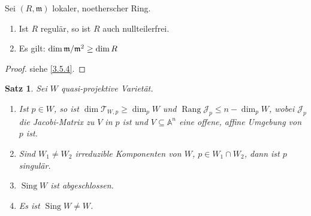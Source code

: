 \documentclass[a4paper,12pt]{scrbook}
\theoremstyle{keinenummern} %
\theoremstyle{mitnummern}
\newtheorem{satz}{Satz}
\theoremstyle{unserbeweis}
\newtheorem{proof}{Beweis}
\def\A{\mathbb{A}}
\newcommand{\J}{\mathcal{J}}
\def\T{\mathcal{T}}
\def\m{\mathfrak{m}}
\newcommand{\Rang}{\operatorname{Rang}}
\newcommand{\Sing}{\operatorname{Sing}}
\newcommand{\Quotient}[2]{
  \mathchoice
  { %
    \raisebox{0.7ex}{\ensuremath{#1}}
    \ensuremath{\mkern-3mu}\big/\ensuremath{\mkern-3mu}
    \raisebox{-0.6ex}{\ensuremath{#2}}
  }
  { %
    #1/#2
  }
  { %
    #1/#2
  }
  { %
    #1/#2
  }
}
\begin{document}
\begin{lem}\label{3.4.3} Sei $(R,\m)$ lokaler, noetherscher Ring.
  \begin{enumerate}
  \item{} Ist $R$ regulär, so ist $R$ auch nullteilerfrei.
  \item{} Es gilt: $\dim \Quotient{\m}{\m^2} \ge \dim R$
  \end{enumerate}
\end{lem}
\begin{proof}siehe \cref{3.5.4}.
\end{proof}

\begin{satz}\label{satz6} Sei $W$ quasi-projektive Varietät.
  \begin{enumerate}
   \item\label{satz6a} Ist $p\in W$, so ist $\dim \T_{W,p} \ge \dim_p W$ und $\Rang \J_p \le n-\dim_p W$, wobei $\J_p$ die Jacobi-Matrix zu $V$ in $p$ ist und $V\subseteq \A^n$ eine offene, affine Umgebung von $p$ ist.
  \item\label{satz6b} Sind $W_1\neq W_2$ irreduzible Komponenten von $W$, $p\in W_1\cap W_2$, dann ist $p$ singulär.
   \item\label{satz6c} $\Sing W$ ist abgeschlossen.
   \item\label{satz6d} Es ist $\Sing W\neq W$.
  \end{enumerate}
\end{satz}
\end{document}
